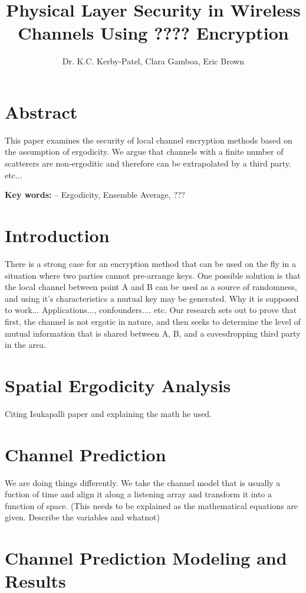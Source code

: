\documentclass[11pt]{article} %
\title{Physical Layer Security in Wireless Channels Using ???? Encryption}
\author{Dr. K.C. Kerby-Patel, Clara Gamboa, Eric Brown}
\begin{document}
\maketitle

\section{Abstract}

This paper examines the security of local channel encryption methods based on the assumption of ergodicity. We argue that channels with a finite number of scatterers are non-ergoditic and therefore can be extrapolated by a third party. etc...

\textbf{Key words:} -- Ergodicity, Ensemble Average, ???

\section{Introduction}

There is a strong case for an encryption method that can be used on the fly in a situation where two parties cannot pre-arrange keys. One possible solution is that the local channel between point A and B can be used as a source of randomness, and using it's characteristics a mutual key may be generated. Why it is supposed to work... Applications..., confounders.... etc. Our research sets out to prove that first, the channel is not ergotic in nature, and then seeks to determine the level of mutual information that is shared between A, B, and a eavesdropping third party in the area.

\section{Spatial Ergodicity Analysis}

Citing Isukapalli paper and explaining the math he used.

\section{Channel Prediction}

We are doing things differently. We take the channel model that is usually a fuction of time and align it along a listening array and transform it into a function of space. (This needs to be explained as the mathematical equations are given. Describe the variables and whatnot)

\section{Channel Prediction Modeling and Results}
\end{document}
